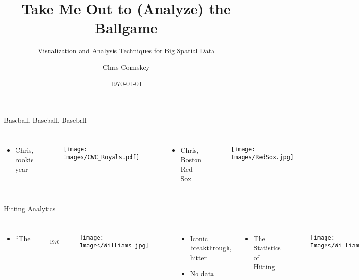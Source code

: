 \documentclass{beamer}
\title{Take Me Out to (Analyze) the Ballgame}
\subtitle{Visualization and Analysis Techniques for Big Spatial Data}
\author{Chris Comiskey}
\institute{Oregon State University}
\date{\today}
\begin{document}
\begin{frame}
  \titlepage
\end{frame}

\begin{frame}{Baseball, Baseball, Baseball} %
\begin{columns}


\begin{itemize}
\item Chris, rookie year
\end{itemize}
        \begin{figure}[H]
      	\centering
      	\texttt{[image: Images/CWC\_Royals.pdf]}
      	\end{figure}


\begin{itemize}
\item Chris, Boston Red Sox
\end{itemize}
  \begin{figure}[H]
	\centering
	\texttt{[image: Images/RedSox.jpg]}
	\end{figure}

\end{columns}
\end{frame}

\begin{frame}{Hitting Analytics} %
\begin{columns}
\begin{itemize}
\item $\text{``The Science of Hitting''}_{\text{1970}}$
\end{itemize}

        \begin{figure}[H]
      	\centering
      	\texttt{[image: Images/Williams.jpg]}
      	\end{figure}

\begin{itemize}
\item Iconic breakthrough, hitter
\item No data
\end{itemize}

\begin{itemize}
\item The Statistics of Hitting
\end{itemize}
  \begin{figure}[H]
	\centering
	\texttt{[image: Images/WilliamsMother.jpg]}
	\end{figure}
\begin{itemize}
\item PITCHf/x data, R, heat maps
\item SGLMMs, Stan, PPMs, INLA
\end{itemize}

\end{columns}
\end{frame}
\end{document}
